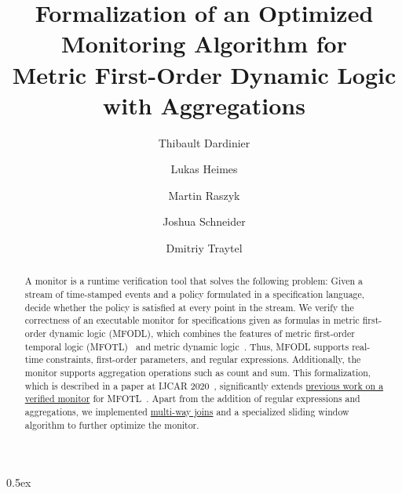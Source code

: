 \documentclass[10pt,a4paper]{article}
\begin{document}
\title{Formalization of an Optimized Monitoring Algorithm for\\ Metric First-Order Dynamic Logic with Aggregations}
\author{Thibault Dardinier \and Lukas Heimes \and Martin Raszyk \and Joshua Schneider \and Dmitriy Traytel}

\maketitle

\begin{abstract}
A monitor is a runtime verification tool that solves the following problem: Given a stream
of time-stamped events and a policy formulated in a specification language, decide
whether the policy is satisfied at every point in the stream. We verify the correctness
of an executable monitor for specifications given as formulas in metric first-order
dynamic logic (MFODL), which combines the features of metric first-order temporal logic
(MFOTL)~\cite{BasinKMZ-JACM15} and metric dynamic logic~\cite{BasinKT-RV17}. Thus, MFODL
supports real-time constraints, first-order parameters, and regular expressions.
Additionally, the monitor supports aggregation operations such as count and sum. This
formalization, which is described in a paper at IJCAR
2020~\cite{BasinDHKRST2020IJCAR}, significantly extends
\href{https://www.isa-afp.org/entries/MFOTL_Monitor.html}{previous work on a verified
monitor} for MFOTL~\cite{SchneiderBKT2019RV}. Apart from the addition of regular
expressions and aggregations, we implemented
\href{https://www.isa-afp.org/entries/Generic_Join.html}{multi-way joins} and
a specialized sliding window algorithm to further optimize the monitor.
\end{abstract}

\tableofcontents

\parindent 0pt\parskip 0.5ex





\end{document}
